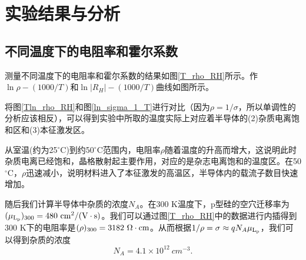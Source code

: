 \documentclass[font=default]{mpltx}
\begin{document}
\section{实验结果与分析}
\subsection{不同温度下的电阻率和霍尔系数}
测量不同温度下的电阻率和霍尔系数的结果如图\ref{T_rho_RH}所示。作$\ln\rho-(1000/T)$和$\ln |R_H|-(1000/T)$曲线如图所示。

将图\ref{Tln_rho_RH}和图\ref{ln_sigma_1_T}进行对比（因为$\rho=1/\sigma$，所以单调性的分析应该相反），可以得到实验中所取的温度实际上对应着半导体的(2)杂质电离饱和区和(3)本征激发区。

从室温(约为25$^\circ$C)到约50$^\circ$C范围内，电阻率$\rho$随着温度的升高而增大，这说明此时杂质电离已经饱和，晶格散射起主要作用，对应的是杂志电离饱和的温度区。在50$^\circ$C，$\rho$迅速减小，说明材料进入了本征激发的高温区，半导体内的载流子数目快速增加。

随后我们计算半导体中杂质的浓度$N_A$。在300 K温度下，p型硅的空穴迁移率为$(\mu_{\rm L_p})_{300}=480\ {\rm cm^2/(V\cdot s)}$。我们可以通过图\ref{T_rho_RH}中的数据进行内插得到300 K下的电阻率是$(\rho)_{300}=3182\ \Omega\cdot{\rm cm}$。从而根据$1/\rho=\sigma\approx qN_A\mu_{\rm L_p}$，我们可以得到杂质的浓度\begin{equation}\label{NA_value}
  N_A=4.1\times10^{12}\ cm^{-3}.
\end{equation}
\end{document}
